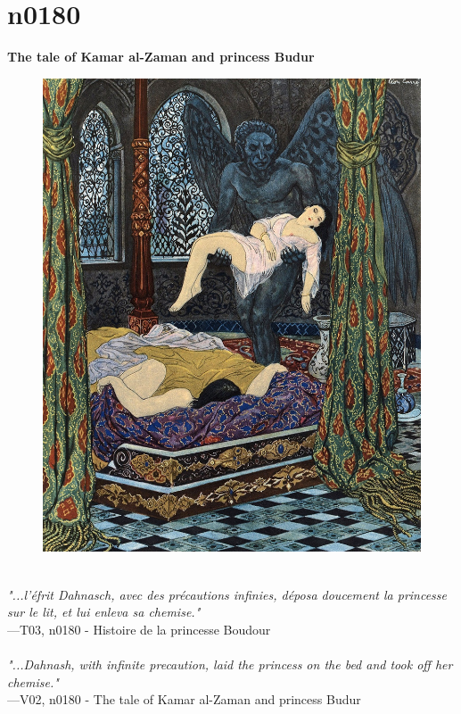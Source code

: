 \documentclass[../Carre_nights.tex]{subfiles}
\begin{document}
\section{n0180}
\textbf{\Large{The tale of Kamar al-Zaman and princess Budur}} \\

\begin{figure}[ht]
\centering
\includegraphics[height=\figsize]{illustrations/volume_3/T03, n0180 - Histoire de la princesse Boudour.jpg}
\end{figure}

\textit{\\
"...l’éfrit Dahnasch, avec des précautions infinies, déposa doucement la princesse sur le lit, et lui enleva sa chemise."} \\
—T03, n0180 - Histoire de la princesse Boudour \\~\\
\textit{"...Dahnash, with infinite precaution, laid the princess on the bed and took off her chemise."} \\
—V02, n0180 - The tale of Kamar al-Zaman and princess Budur
\end{document}
